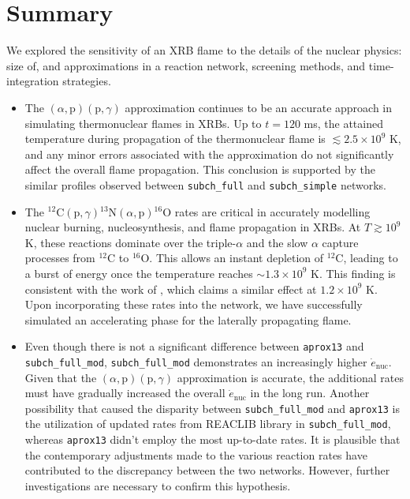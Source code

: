 \documentclass[preprint,times,tighten,linenumbers,trackchanges]{aastex631}
\begin{document}
\section{Summary}

We explored the sensitivity of an XRB flame to the details of the
nuclear physics: size of, and approximations in a reaction network, screening methods, and time-integration strategies. 


\begin{itemize}
    \item The $(\alpha, \mbox{p})(\mbox{p}, \gamma)$ approximation continues to be an accurate approach in simulating thermonuclear flames in XRBs. Up to $t = 120$ ms, the attained temperature during propagation of the thermonuclear flame is $\lesssim 2.5 \times 10^9$ K, and any minor errors associated with the approximation do not significantly affect the overall flame propagation. This conclusion is supported by the similar profiles observed between {\tt subch\_full} and {\tt subch\_simple} networks.
    
    \item The ${}^{12}\mbox{C}(\mbox{p}, \gamma) {}^{13}\mbox{N}(\alpha, \mbox{p}){}^{16}\mbox{O}$ rates are critical in accurately modelling nuclear burning, nucleosynthesis, and flame propagation in XRBs. At $T \gtrsim 10^9$ K, these reactions dominate over the triple-$\alpha$ and the slow $\alpha$ capture processes from ${}^{12}$C to ${}^{16}$O. This allows an instant depletion of ${}^{12}$C, leading to a burst of energy once the temperature reaches $\sim 1.3 \times 10^9$ K. This finding is consistent with the work of \cite{Weinberg_2006}, which claims a similar effect at $1.2 \times 10^9$ K. Upon incorporating these rates into the network, we have successfully simulated an accelerating phase for the laterally propagating flame.

    \item Even though there is not a significant difference between {\tt aprox13} and {\tt subch\_full\_mod}, {\tt subch\_full\_mod} demonstrates an increasingly higher $\dot{e}_{\textrm{nuc}}$. Given that the $(\alpha, \mbox{p})(\mbox{p}, \gamma)$ approximation is accurate, the additional rates must have gradually increased the overall $\dot{e}_{\textrm{nuc}}$ in the long run.
    Another possibility that caused the disparity between {\tt subch\_full\_mod} and {\tt aprox13} is the utilization of updated rates from {\sf REACLIB} library in {\tt subch\_full\_mod}, whereas {\tt aprox13} didn't employ the most up-to-date rates. It is plausible that the contemporary adjustments made to the various reaction rates have contributed to the discrepancy between the two networks. However, further investigations are necessary to confirm this hypothesis.


\end{itemize}
\end{document}

